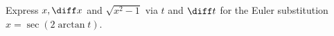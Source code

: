 Express $x, \diff x $ and $\sqrt{x^2-1}$ via $t$ and $\diff t$ for the Euler substitution $x=\sec(2\arctan t)$.
